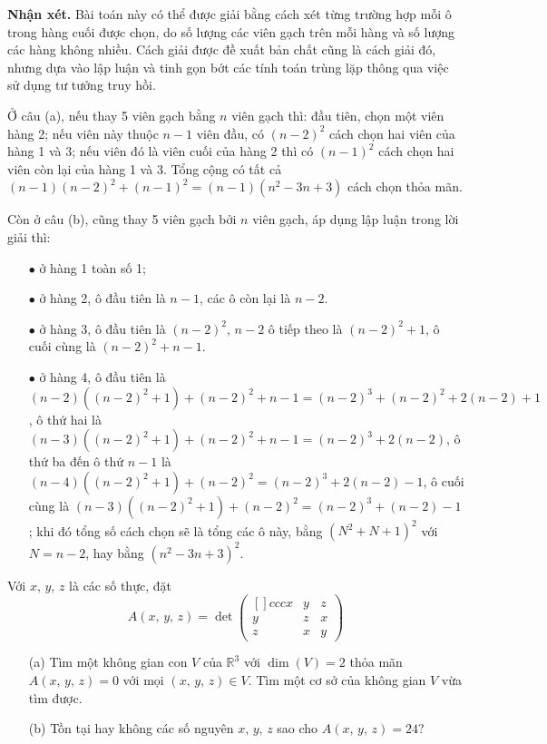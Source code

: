 \textbf{Nhận xét. }Bài toán này có thể được giải bằng cách xét từng trường hợp mỗi ô trong hàng cuối được chọn, do số lượng các viên gạch trên mỗi hàng và số lượng các hàng không nhiều. Cách giải được đề xuất bản chất cũng là cách giải đó, nhưng dựa vào lập luận và tinh gọn bớt các tính toán trùng lặp thông qua việc sử dụng tư tưởng truy hồi.

Ở câu (a), nếu thay 5 viên gạch bằng $n$ viên gạch thì:  đầu tiên, chọn một viên hàng 2; nếu viên này thuộc $n - 1$ viên đầu, có $(n - 2)^2$ cách chọn hai viên của hàng 1 và 3; nếu viên đó là viên cuối của hàng 2 thì có $(n - 1)^2$ cách chọn hai viên còn lại của hàng 1 và 3. Tổng cộng có tất cả $(n - 1)(n - 2)^2 + (n - 1)^2 = (n - 1)(n^2 - 3n + 3)$ cách chọn thỏa mãn.

Còn ở câu (b), cũng thay 5 viên gạch bởi $n$ viên gạch, áp dụng lập luận trong lời giải thì:
\begin{enumerate}
    \item[$\bullet$] ở hàng 1 toàn số 1;
    \item[$\bullet$] ở hàng 2, ô đầu tiên là $n-1$, các ô còn lại là $n-2$.
    \item[$\bullet$] ở hàng 3, ô đầu tiên là $(n-2)^2$, $n-2$ ô tiếp theo là $(n-2)^2+1$, ô cuối cùng là $(n-2)^2 + n-1$.
    \item[$\bullet$] ở hàng 4, ô đầu tiên là $(n-2)\left((n-2)^2+1\right)+(n-2)^2+n-1 = (n-2)^3+(n-2)^2+2(n-2)+1$, ô thứ hai là $(n-3)\left((n-2)^2+1\right)+(n-2)^2+n-1 = (n-2)^3+2(n-2)$, ô thứ ba đến ô thứ $n-1$ là $(n-4)\left((n-2)^2+1\right)+(n-2)^2 = (n-2)^3+2(n-2)-1$, ô cuối cùng là $(n-3)\left((n-2)^2+1\right)+(n-2)^2 = (n-2)^3+(n-2)-1$; khi đó tổng số cách chọn sẽ là tổng các ô này, bằng $\left(N^2 + N + 1\right)^2$ với $N = n-2$, hay bằng $(n^2 - 3n + 3)^2$.
\end{enumerate} 

\begin{tcolorbox}[title=\textbf{Bài toán B.5 + A.4.},breakable]
    Với $x,\,y,\,z$ là các số thực, đặt 
    $$A(x,\,y,\,z) = \det \begin{pmatrix}[]{ccc}
        x & y & z \\
        y & z & x \\
        z & x & y
    \end{pmatrix}$$
    \begin{enumerate}
        \item[(a)] {Tìm một không gian con $V$ của $\mathbb{R}^3$ với $\dim (V) = 2$ thỏa mãn $A(x,\,y,\,z)=0$ với mọi $(x,\,y,\,z) \in V$. Tìm một cơ sở của không gian $V$ vừa tìm được.}
        \item[(b)] {Tồn tại hay không các số nguyên $x,\,y,\,z$ sao cho $A(x,\,y,\,z) = 24$?}
    \end{enumerate}
\end{tcolorbox}

